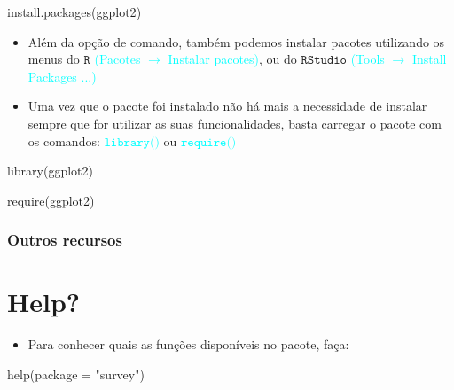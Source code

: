 \documentclass[
]{book}
\newenvironment{Shaded}{\begin{snugshade}}{\end{snugshade}}
\newcommand{\AttributeTok}[1]{\textcolor[rgb]{0.77,0.63,0.00}{#1}}
\newcommand{\FunctionTok}[1]{\textcolor[rgb]{0.00,0.00,0.00}{#1}}
\newcommand{\NormalTok}[1]{#1}
\newcommand{\StringTok}[1]{\textcolor[rgb]{0.31,0.60,0.02}{#1}}
\providecommand{\tightlist}{%
  \setlength{\itemsep}{0pt}\setlength{\parskip}{0pt}}
\begin{document}
\begin{Shaded}
\begin{Highlighting}[]
\FunctionTok{install.packages}\NormalTok{(}\StringTok{\textquotesingle{}ggplot2\textquotesingle{}}\NormalTok{)}
\end{Highlighting}
\end{Shaded}

\begin{itemize}
\item
  Além da opção de comando, também podemos instalar pacotes utilizando os menus do \(\texttt{R}\) \textcolor{cyan}{(Pacotes $\rightarrow$ Instalar pacotes)}, ou do \(\texttt{RStudio}\) \textcolor{cyan}{(Tools $\rightarrow$ Install Packages ...)}
\item
  Uma vez que o pacote foi instalado não há mais a necessidade de instalar sempre que for utilizar as suas funcionalidades, basta carregar o pacote com os comandos: \textcolor{cyan}{$\texttt{library()}$} ou \textcolor{cyan}{$\texttt{require()}$}
\end{itemize}

\begin{Shaded}
\begin{Highlighting}[]
\FunctionTok{library}\NormalTok{(ggplot2)}
\end{Highlighting}
\end{Shaded}

\begin{Shaded}
\begin{Highlighting}[]
\FunctionTok{require}\NormalTok{(ggplot2)}
\end{Highlighting}
\end{Shaded}

\hypertarget{outros-recursos}{%
\subsection{Outros recursos}\label{outros-recursos}}

\hypertarget{help}{%
\chapter{Help?}\label{help}}

\begin{itemize}
\tightlist
\item
  Para conhecer quais as funções disponíveis no pacote, faça:
\end{itemize}

\begin{Shaded}
\begin{Highlighting}[]
\FunctionTok{help}\NormalTok{(}\AttributeTok{package =} \StringTok{"survey"}\NormalTok{)}
\end{Highlighting}
\end{Shaded}
\end{document}

